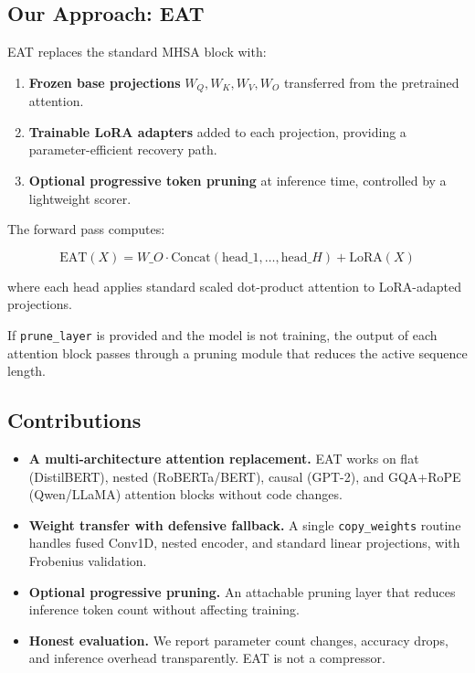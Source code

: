 \subsection{Our Approach: EAT}

EAT replaces the standard MHSA block with:

\begin{enumerate}
\item \textbf{Frozen base projections} $W_Q, W_K, W_V, W_O$ transferred from the
  pretrained attention.
\item \textbf{Trainable LoRA adapters} added to each projection, providing a
  parameter-efficient recovery path.
\item \textbf{Optional progressive token pruning} at inference time, controlled by
  a lightweight scorer.

\end{enumerate}
The forward pass computes:

\[
\text{EAT}(X) = W\_O \cdot \text{Concat}(\text{head}\_1, \dots, \text{head}\_H) + \text{LoRA}(X)
\tag{1.1}
\]

where each head applies standard scaled dot-product attention to 
LoRA-adapted projections.

If \texttt{prune\_layer} is provided and the model is not training, the output of 
each attention block passes through a pruning module that reduces the active 
sequence length.

\subsection{Contributions}

\begin{itemize}
\item \textbf{A multi-architecture attention replacement.} EAT works on flat
  (DistilBERT), nested (RoBERTa/BERT), causal (GPT-2), and GQA+RoPE
  (Qwen/LLaMA) attention blocks without code changes.
\item \textbf{Weight transfer with defensive fallback.} A single \texttt{copy\_weights}
  routine handles fused Conv1D, nested encoder, and standard linear
  projections, with Frobenius validation.
\item \textbf{Optional progressive pruning.} An attachable pruning layer that reduces
  inference token count without affecting training.
\item \textbf{Honest evaluation.} We report parameter count changes, accuracy drops,
  and inference overhead transparently. EAT is not a compressor.

\end{itemize}
